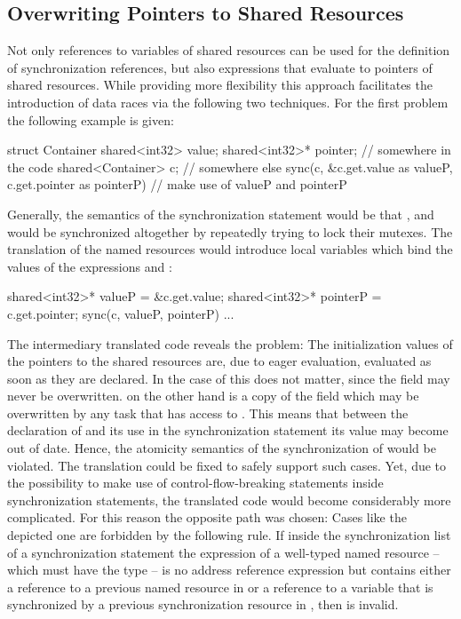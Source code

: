 \subsection{Overwriting Pointers to Shared Resources}
\label{overwriting_shared_pointers}
Not only references to variables of shared resources can be used for the definition of synchronization references, but also expressions that evaluate to pointers of shared resources. While providing more flexibility this approach facilitates the introduction of data races via the following two techniques. For the first problem the following example is given:
\begin{ccode}
struct Container {
  shared<int32> value;
  shared<int32>* pointer;
}
// somewhere in the code
shared<Container> c;
// somewhere else
sync(c, &c.get.value as valueP, c.get.pointer as pointerP) {
  // make use of valueP and pointerP
}
\end{ccode}
Generally, the semantics of the synchronization statement would be that ,  and  would be synchronized altogether by repeatedly trying to lock their mutexes. The translation of the named resources would introduce local variables which bind the values of the expressions  and :
\begin{ccode}
shared<int32>* valueP = &c.get.value;
shared<int32>* pointerP = c.get.pointer;
sync(c, valueP, pointerP) {...}
\end{ccode}
The intermediary translated code reveals the problem: The initialization values of the pointers to the shared resources are, due to eager evaluation, evaluated as soon as they are declared. In the case of  this does not matter, since the  field may never be overwritten.  on the other hand is a copy of the field  which may be overwritten by any task that has access to . This means that between the declaration of  and its use in the synchronization statement its value may become out of date. Hence, the atomicity semantics of the synchronization of  would be violated. The translation could be fixed to safely support such cases. Yet, due to the possibility to make use of control-flow-breaking statements inside synchronization statements, the translated code would become considerably more complicated. For this reason the opposite path was chosen: Cases like the depicted one are forbidden by the following rule. If inside the synchronization list  of a synchronization statement the expression of a well-typed named resource  -- which must have the type  -- is no address reference expression  but contains either a reference to a previous named resource in  or a reference to a variable that is synchronized by a previous synchronization resource in , then  is invalid.

